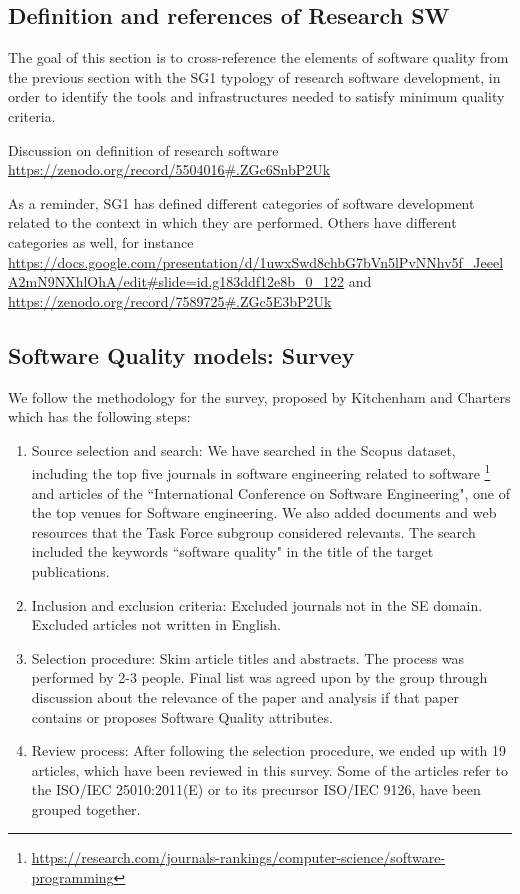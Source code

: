 \subsection{Definition and references of Research SW}


The goal of this section is to cross-reference the elements of
software quality from the previous section with the SG1 typology of
research software development, in order to identify the tools and
infrastructures needed to satisfy minimum quality criteria. 

Discussion on definition of research software \url{https://zenodo.org/record/5504016#.ZGc6SnbP2Uk}

As a reminder, SG1 has defined different categories of software
development related to the context in which they are performed. Others have different categories as well, for instance \url{https://docs.google.com/presentation/d/1uwxSwd8chbG7bVn5lPvNNhv5f_JeeelA2mN9NXhlOhA/edit#slide=id.g183ddf12e8b_0_122} and \url{https://zenodo.org/record/7589725#.ZGc5E3bP2Uk}

\subsection{Software Quality models: Survey}

We follow the methodology for the survey, proposed by Kitchenham and Charters \cite{keele2007guidelines} which has the following steps:

\begin{enumerate}
    \item Source selection and search: We have searched in the Scopus dataset, including the top five journals in software engineering related to software \footnote{\url{https://research.com/journals-rankings/computer-science/software-programming}} and articles of the  ``International Conference on Software Engineering", one of the top venues for Software engineering. We also added documents and web resources that the Task Force subgroup considered relevants. The search included the keywords ``software quality" in the title of the target publications.
    \item Inclusion and exclusion criteria: Excluded journals not in the SE domain. Excluded articles not written in English.
    \item Selection procedure: Skim article titles and abstracts. The process was performed by 2-3 people. Final list was agreed upon by the group through discussion about the relevance of the paper and analysis if that paper contains or proposes Software Quality attributes.
    \item Review process: After following the selection procedure, we ended up with 19 articles, which have been reviewed in this survey. Some of the articles refer to the ISO/IEC 25010:2011(E)\cite{iso_25010_2011_2017} or to its precursor ISO/IEC 9126, have been grouped together.
\end{enumerate}

